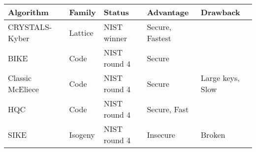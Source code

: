\documentclass{article}
\begin{document}
\begin{table}[]
\begin{tabular}{|l|l|l|l|l|}
\hline
Algorithm        & Family  & Status       & Advantage       & Drawback         \\ \hline
CRYSTALS-Kyber   & Lattice & NIST winner  & Secure, Fastest &                  \\ \hline
BIKE             & Code    & NIST round 4 & Secure          &                  \\ \hline
Classic McEliece & Code    & NIST round 4 & Secure          & Large keys, Slow \\ \hline
HQC              & Code    & NIST round 4 & Secure, Fast    &                  \\ \hline
SIKE             & Isogeny & NIST round 4 & Insecure        & Broken           \\ \hline
\end{tabular}
\end{table}
\end{document}
